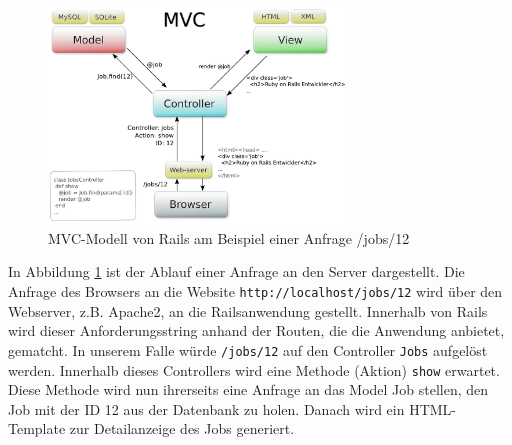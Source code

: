 \begin{figure}[h]
  \centering
  \includegraphics[width=0.7\textwidth]{./diagrams/mvc.pdf}
  \caption{MVC-Modell von Rails am Beispiel einer Anfrage /jobs/12}
  \label{fig:mvcrails}
\end{figure}
In Abbildung \ref{fig:mvcrails} ist der Ablauf einer Anfrage an den Server dargestellt. Die Anfrage des Browsers an die Website \texttt{http://localhost/jobs/12} wird über den Webserver, z.B. Apache2, an die Railsanwendung gestellt. Innerhalb von Rails wird dieser Anforderungsstring anhand der Routen, die die Anwendung anbietet, gematcht. In unserem Falle würde \texttt{/jobs/12} auf den Controller \texttt{Jobs} aufgelöst werden. Innerhalb dieses Controllers wird eine Methode (Aktion) \texttt{show} erwartet.
Diese Methode wird nun ihrerseits eine Anfrage an das Model Job stellen, den Job mit der ID 12 aus der Datenbank zu holen. Danach wird ein HTML-Template zur Detailanzeige des Jobs generiert.


